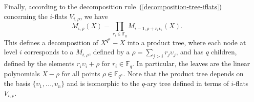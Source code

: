 \documentclass{article}
\newcommand{\ff}[1]{\mathbb{F}_{#1}}
\newcommand{\qq}{q}
\newcommand{\nn}{n}
\newcommand{\qn}{{\qq^\nn}}
\newcommand{\basef}{\ff{\qq}}
\newcommand{\extf}{\ff{\qn}}
\begin{document}
Finally, according to the decomposition rule~(\ref{decomposition-tree-iflats}) concerning the $i$-flats $V_{i,\rho}$, we have
\begin{equation}
\label{node_product}
  M_{i,\rho}(X) = \prod_{r_i\in\basef} M_{i-1,\rho+r_i\upsilon_i}(X).
\end{equation}
This defines a decomposition of $X^{\qn}-X$ into a product tree, where
each node at level $i$ corresponds to a $M_{i,\rho}$, defined by a
$\rho=\sum_{j>i}r_j\upsilon_j$, and has $\qq$ children, defined by
the elements $r_i\upsilon_{i}+\rho$ for $r_i \in\basef$. In particular,
the leaves are the linear polynomials $X-\rho$ for all points
$\rho\in\extf$.
%
Note that the product tree depends on the basis $\{\upsilon_1,\ldots,\upsilon_\nn\}$ and is isomorphic to the $q$-ary tree defined in terms of $i$-flats $V_{i,\rho}$.


\end{document}

